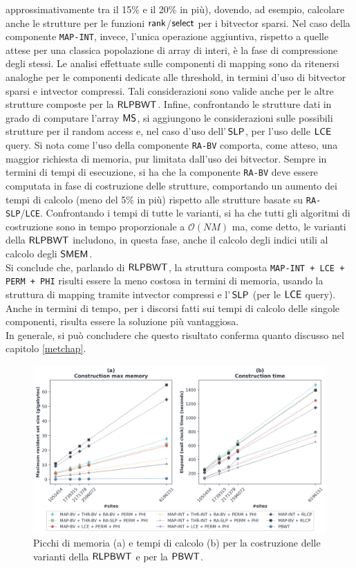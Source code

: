 approssimativamente tra il 15\% e il 20\% in più), dovendo, ad esempio,
calcolare anche le strutture per le funzioni $\mbox{\rm {\sf rank}}$/$\mbox{\rm {\sf select}}$ per i bitvector
sparsi. Nel caso della componente 
\texttt{MAP-INT}, invece, l'unica operazione aggiuntiva, rispetto a quelle attese
per una classica popolazione di array di interi, è la fase di compressione degli
stessi. Le analisi effettuate sulle componenti di mapping sono da
ritenersi analoghe per le componenti dedicate alle threshold, in
termini d'uso di bitvector sparsi e intvector compressi.
Tali considerazioni sono valide anche per le altre strutture
composte per la $\mbox{\rm {\sf RLPBWT}}$. Infine, confrontando le strutture dati in grado
di computare l'array $\mbox{\rm {\sf MS}}$, si aggiungono le considerazioni sulle possibili
strutture per il random access e, nel caso d'uso dell'$\,\mbox{\rm {\sf SLP}}$, per l'uso
delle $\mbox{\rm {\sf LCE}}$ query. Si nota come l'uso della componente \texttt{RA-BV}
comporta, come atteso, una maggior richiesta di memoria, pur limitata dall'uso
dei bitvector. Sempre in termini di tempi di esecuzione, si ha che la
componente \texttt{RA-BV} deve essere computata in fase di costruzione delle
strutture, comportando un aumento dei tempi di calcolo (meno del 5\% in
più) rispetto alle strutture basate su
\texttt{RA-SLP}/\texttt{LCE}. Confrontando i tempi di  
tutte le varianti, si ha che tutti gli algoritmi di costruzione sono in tempo
proporzionale a $\mathcal{O}(NM)$ ma, come detto, le varianti della
$\mbox{\rm {\sf RLPBWT}}$ includono, in questa fase, anche il calcolo degli indici
utili al calcolo degli $\mbox{\rm {\sf SMEM}}$. \\
Si conclude che, parlando di $\mbox{\rm {\sf RLPBWT}}$, la
struttura composta \texttt{MAP-INT + LCE + PERM + PHI} risulti essere la meno
costosa in termini di memoria, usando la struttura di mapping tramite
intvector compressi e l'$\,\mbox{\rm {\sf SLP}}$ (per le $\mbox{\rm {\sf LCE}}$ query).
Anche in termini di tempo, per i discorsi fatti sui tempi di calcolo
delle singole componenti, risulta essere la soluzione più vantaggiosa.\\
In generale, si può 
concludere che questo risultato conferma quanto discusso nel capitolo
\ref{metchap}.\\ 
\begin{figure}
  \centering
  \includegraphics[width=\linewidth]{img/make_time_mem_paper.png}
  \caption{Picchi di memoria (a) e tempi di calcolo (b) per la
    costruzione delle varianti della $\mbox{\rm {\sf RLPBWT}}$ e per 
    la $\mbox{\rm {\sf PBWT}}$.}
  \label{fig:maketimememchr}
\end{figure}
